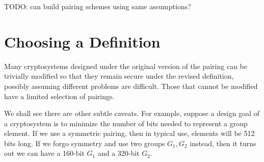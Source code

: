 TODO: can build pairing schemes using same assumptions?

\section{Choosing a Definition}

Many cryptosystems designed under the original version of the pairing can
be trivially modified so that they remain secure under the revised
definition, possibly assuming different problems are difficult.
Those that cannot be modified have a limited selection of pairings.

We shall see there are other subtle caveats.
For example, suppose a design goal of a cryptosystem is to minimize the
number of bits needed to represent a group element. If we use
a symmetric pairing, then in typical use, elements will be 512 bits long.
If we forgo symmetry and use two groups $G_1, G_2$ instead,
then it turns out we can have a 160-bit $G_1$ and a 320-bit $G_2$.
